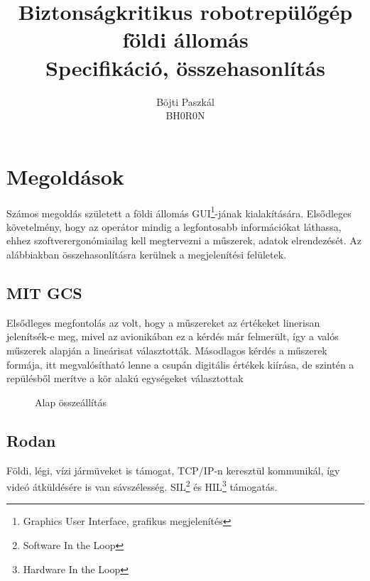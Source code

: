 \documentclass[12pt]{article}
\title{Biztonságkritikus robotrepül\H{o}gép földi állomás\\ Specifikáció, összehasonlítás}
\author{Böjti Paszkál\\BH0R0N}
\begin{document}
\maketitle

\section{Megoldások}
Számos megoldás született a földi állomás GUI\footnote{Graphics User Interface, grafikus megjelenítés}-jának kialakítására. Els\H{o}dleges követelmény, hogy az operátor mindig a legfontosabb információkat láthassa, ehhez szoftverergonómiailag kell megtervezni a m\H{u}szerek, adatok elrendezését.
Az alábbiakban összehasonlításra kerülnek a megjelenítési felületek.

\subsection{MIT GCS}
\cite{bib:mit}Els\H{o}dleges megfontolás az volt, hogy a m\H{u}szereket az értékeket linerisan jelenítsék-e meg, mivel az avionikában ez a kérdés már felmerült, így a valós m\H{u}szerek alapján a lineárisat választották. Másodlagos kérdés a m\H{u}szerek formája, itt megvalósítható lenne a csupán digitális értékek kiírása, de szintén a repülésb\H{o}l merítve a kör alakú egységeket választottak

\begin{figure}[H]
	\centering
	\caption{Alap összeállítás}
	\label{fig:mit}
\end{figure}

\subsection{Rodan}
\cite{bib:rodan}Földi, légi, vízi jármüveket is támogat, TCP/IP-n keresztül kommunikál, így videó átküldésére is van sávszélesség. SIL\footnote{Software In the Loop} és HIL\footnote{Hardware In the Loop} támogatás.
\end{document}
